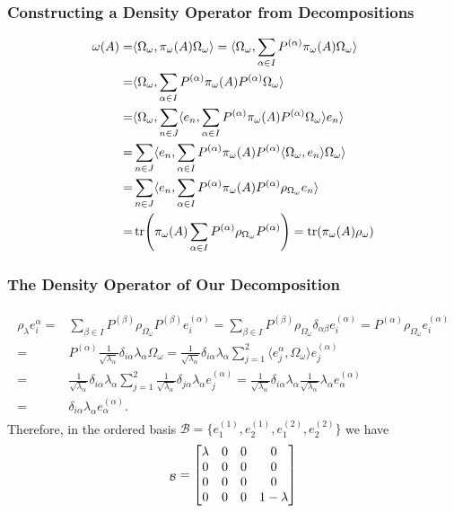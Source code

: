 \documentclass{beamer}
\begin{document}
\begin{frame}
	\frametitle{Constructing a Density Operator from Decompositions}
	\begin{align}
	\begin{split}
		\omega(A)=&\langle\Omega_\omega,\pi_\omega(A)\Omega_\omega\rangle=\langle\Omega_\omega,\sum_{\alpha\in I}P^{(\alpha)}\pi_\omega(A)\Omega_\omega\rangle\\
		=&\langle\Omega_\omega,\sum_{\alpha\in I}P^{(\alpha)}\pi_\omega(A)P^{(\alpha)}\Omega_\omega\rangle\\
		=&\langle\Omega_\omega,\sum_{n\in J}\langle e_n,\sum_{\alpha\in I}P^{(\alpha)}\pi_\omega(A)P^{(\alpha)}\Omega_\omega\rangle e_n\rangle\\
		=&\sum_{n\in J}\langle e_n,\sum_{\alpha\in I}P^{(\alpha)}\pi_\omega(A)P^{(\alpha)}\langle\Omega_\omega,e_n\rangle\Omega_\omega\rangle\\
		=&\sum_{n\in J}\langle e_n,\sum_{\alpha\in I}P^{(\alpha)}\pi_\omega(A)P^{(\alpha)}\rho_{\Omega_\omega}e_n\rangle\\
		=&\tr(\pi_\omega(A)\sum_{\alpha\in I}P^{(\alpha)}\rho_{\Omega_\omega}P^{(\alpha)})=\tr(\pi_\omega(A)\rho_\omega)
	\end{split}
	\end{align}
\end{frame}

\begin{frame}
	\frametitle{The Density Operator of Our Decomposition}
	\begin{align}
	\begin{split}
		\rho_\lambda e_i^{\alpha}=&\sum_{\beta\in I}P^{(\beta)}\rho_{\Omega_\omega}P^{(\beta)}e_i^{(\alpha)}=\sum_{\beta\in I}P^{(\beta)}\rho_{\Omega_\omega}\delta_{\alpha\beta}e_i^{(\alpha)}=P^{(\alpha)}\rho_{\Omega_\omega}e_i^{(\alpha)}\\
		=&P^{(\alpha)}\frac{1}{\sqrt{\lambda_\alpha}}\delta_{i\alpha}\lambda_\alpha\Omega_\omega=\frac{1}{\sqrt{\lambda_\alpha}}\delta_{i\alpha}\lambda_\alpha\sum_{j=1}^2\langle e_j^{\alpha},\Omega_\omega\rangle e_j^{(\alpha)}\\
		=&\frac{1}{\sqrt{\lambda_\alpha}}\delta_{i\alpha}\lambda_\alpha\sum_{j=1}^2\frac{1}{\sqrt{\lambda_\alpha}}\delta_{j\alpha}\lambda_\alpha e_j^{(\alpha)}=\frac{1}{\sqrt{\lambda_\alpha}}\delta_{i\alpha}\lambda_\alpha\frac{1}{\sqrt{\lambda_\alpha}}\lambda_\alpha e_\alpha^{(\alpha)}\\
		=&\delta_{i\alpha}\lambda_\alpha e_\alpha^{(\alpha)}.
	\end{split}
	\end{align}
	Therefore, in the ordered basis $\mathcal{B}=\{e_1^{(1)},e_2^{(1)},e_1^{(2)},e_2^{(2)}\}$ we have
	\begin{equation}
		[\rho_\lambda]_\mathcal{B}=\mqty[\lambda & 0 & 0 & 0\\ 0 & 0 & 0&0\\0&0&0&0\\0&0&0&1-\lambda]
	\end{equation}
\end{frame}
\end{document}
